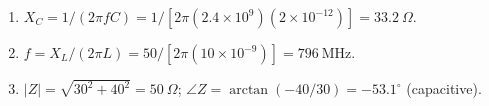 \begin{enumerate}[leftmargin=1.6em,itemsep=2pt]
\item $X_C = 1/(2\pi f C) = 1/[2\pi(2.4\times10^{9})(2\times10^{-12})] = 33.2\ \Omega$.
\item $f = X_L/(2\pi L) = 50/[2\pi(10\times10^{-9})] = 796\ \text{MHz}$.
\item $|Z| = \sqrt{30^2 + 40^2} = 50\ \Omega$; $\angle Z = \arctan(-40/30) = -53.1^{\circ}$ (capacitive).
\end{enumerate}
